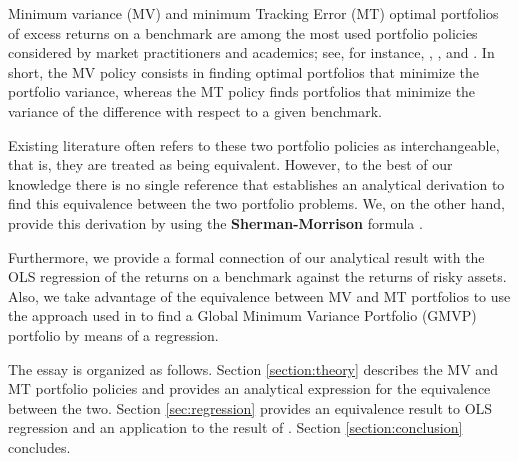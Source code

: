 \documentclass[12pt,oneside,a4paper]{memoir}
\begin{document}

Minimum variance (MV) and minimum Tracking Error (MT) optimal portfolios of excess returns on a benchmark are among the most used portfolio policies considered by market practitioners and academics; see, for instance, , ,  and .
In short, the MV policy consists in finding optimal portfolios that minimize the portfolio variance, whereas the MT policy finds portfolios that minimize the variance of the difference with respect to a given benchmark.

Existing literature often refers to these two portfolio policies as interchangeable, that is, they are treated as being equivalent.
However, to the best of our knowledge there is no single reference that establishes an analytical derivation to find this equivalence between the two portfolio problems.
We, on the other hand, provide this derivation by using the \textbf{Sherman-Morrison} formula \cite{matcook2012}.

Furthermore, we provide a formal connection of our analytical result with the OLS regression of the returns on a benchmark against the returns of risky assets.
Also, we take advantage of the equivalence between MV and MT portfolios to use the approach used in  to find a Global Minimum Variance Portfolio (GMVP) portfolio by means of a regression.



The essay is organized as follows.
Section \ref{section:theory} describes the MV and MT portfolio policies and provides an analytical expression for the equivalence between the two.
Section \ref{sec:regression} provides an equivalence result to OLS regression and an application to the result of .
Section \ref{section:conclusion} concludes.


\end{document}
